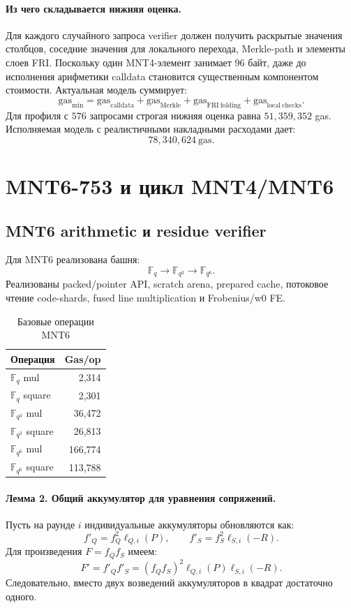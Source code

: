 \documentclass[12pt,a4paper]{article}
\newcommand{\Fq}{\mathbb{F}_q}
\newcommand{\Gas}{\mathrm{gas}}
\begin{document}
\paragraph{Из чего складывается нижняя оценка.}
Для каждого случайного запроса verifier должен получить раскрытые значения
столбцов, соседние значения для локального перехода, Merkle-path и элементы
слоев FRI. Поскольку один MNT4-элемент занимает $96$ байт, даже до исполнения
арифметики calldata становится существенным компонентом стоимости. Актуальная
модель суммирует:
\[
    \Gas_{\min}
    =
    \Gas_{\mathrm{calldata}}
    +
    \Gas_{\mathrm{Merkle}}
    +
    \Gas_{\mathrm{FRI\ folding}}
    +
    \Gas_{\mathrm{local\ checks}}.
\]
Для профиля с $576$ запросами строгая нижняя оценка равна
$51{,}359{,}352$ gas. Исполняемая модель с реалистичными накладными расходами дает:
\[
    78{,}340{,}624\ \Gas.
\]

\section{MNT6-753 и цикл MNT4/MNT6}

\subsection{MNT6 arithmetic и residue verifier}

Для MNT6 реализована башня:
\[
    \Fq\longrightarrow\mathbb{F}_{q^3}\longrightarrow\mathbb{F}_{q^6}.
\]
Реализованы packed/pointer API, scratch arena, prepared cache, потоковое чтение
code-shards, fused line multiplication и Frobenius/w0 FE.

\begin{table}[htbp]
\centering
\caption{Базовые операции MNT6}
\small
\begin{tabular}{l r}
\toprule
Операция & Gas/op \\
\midrule
$\Fq$ mul & 2,314 \\
$\Fq$ square & 2,301 \\
$\mathbb{F}_{q^3}$ mul & 36,472 \\
$\mathbb{F}_{q^3}$ square & 26,813 \\
$\mathbb{F}_{q^6}$ mul & 166,774 \\
$\mathbb{F}_{q^6}$ square & 113,788 \\
\bottomrule
\end{tabular}
\end{table}

\paragraph{Лемма 2. Общий аккумулятор для уравнения сопряжений.}
Пусть на раунде $i$ индивидуальные аккумуляторы обновляются как:
\[
    f'_{Q}=f_Q^2\ell_{Q,i}(P),
    \qquad
    f'_{S}=f_S^2\ell_{S,i}(-R).
\]
Для произведения $F=f_Qf_S$ имеем:
\[
    F'
    =
    f'_Qf'_S
    =
    (f_Qf_S)^2
    \ell_{Q,i}(P)\ell_{S,i}(-R).
\]
Следовательно, вместо двух возведений аккумуляторов в квадрат достаточно
одного.
\end{document}
